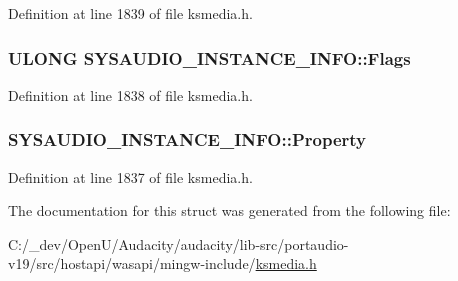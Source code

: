 Definition at line 1839 of file ksmedia.\+h.

\subsubsection[{\texorpdfstring{Flags}{Flags}}]{\setlength{\rightskip}{0pt plus 5cm}U\+L\+O\+NG S\+Y\+S\+A\+U\+D\+I\+O\+\_\+\+I\+N\+S\+T\+A\+N\+C\+E\+\_\+\+I\+N\+F\+O\+::\+Flags}\hypertarget{struct_s_y_s_a_u_d_i_o___i_n_s_t_a_n_c_e___i_n_f_o_a9d8a010d0df392275b8c28b09360edee}{}\label{struct_s_y_s_a_u_d_i_o___i_n_s_t_a_n_c_e___i_n_f_o_a9d8a010d0df392275b8c28b09360edee}


Definition at line 1838 of file ksmedia.\+h.

\subsubsection[{\texorpdfstring{Property}{Property}}]{ S\+Y\+S\+A\+U\+D\+I\+O\+\_\+\+I\+N\+S\+T\+A\+N\+C\+E\+\_\+\+I\+N\+F\+O\+::\+Property}\hypertarget{struct_s_y_s_a_u_d_i_o___i_n_s_t_a_n_c_e___i_n_f_o_afa4397c0635273446387bdc123236e4b}{}\label{struct_s_y_s_a_u_d_i_o___i_n_s_t_a_n_c_e___i_n_f_o_afa4397c0635273446387bdc123236e4b}


Definition at line 1837 of file ksmedia.\+h.



The documentation for this struct was generated from the following file\+:\begin{DoxyCompactItemize}
\item 
C\+:/\+\_\+dev/\+Open\+U/\+Audacity/audacity/lib-\/src/portaudio-\/v19/src/hostapi/wasapi/mingw-\/include/\hyperlink{ksmedia_8h}{ksmedia.\+h}\end{DoxyCompactItemize}
